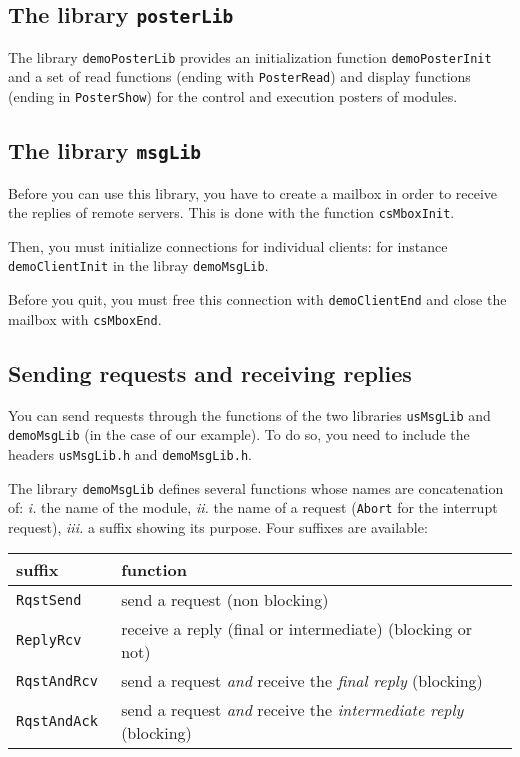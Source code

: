 \subsection{The library \texttt{posterLib}}

The library \texttt{demoPosterLib} provides an initialization function 
\texttt{demoPosterInit} and a set of  read functions (ending with \texttt{PosterRead})
and display  functions (ending in \texttt{PosterShow}) for the  control and
execution posters of modules.

\subsection{The library \texttt{msgLib}}

Before you can use this library, you have to create a mailbox in order to
receive the replies  of remote servers. This is   done with the  function
\texttt{csMboxInit}.

Then, you  must  initialize   connections  for individual    clients: for
instance \texttt{demoClientInit} in the libray \texttt{demoMsgLib}.

Before you  quit, you must  free this connection with \texttt{demoClientEnd}
and close the mailbox with \texttt{csMboxEnd}.


\subsection{Sending requests and receiving replies}

You   can send requests  through the  functions  of the two
libraries  \texttt{usMsgLib}   and \texttt{demoMsgLib}  (in  the case of   our
example). To do so, you need to include the  headers \texttt{usMsgLib.h} and
\texttt{demoMsgLib.h}.

The library \texttt{demoMsgLib}  defines  several functions whose  names are
concatenation of: \emph{i.} the name of the module, \emph{ii.} the name of
a request (\texttt{Abort} for the interrupt request),  \emph{iii.} a  suffix
showing its purpose. Four suffixes are available:


\begin{center}\small\begin{tabularx}{\linewidth}{|l|X|}
\hline
suffix & function \\
\hline
\tt RqstSend & send a request (non blocking) \\

\tt ReplyRcv & receive a reply (final or intermediate)  (blocking or not)\\

\tt RqstAndRcv & send a request \emph{and} receive the \emph{final reply}
(blocking) \\

\tt RqstAndAck & send a request \emph{and} receive the \emph{intermediate reply}
(blocking) \\
\hline
\end{tabularx}\end{center}


